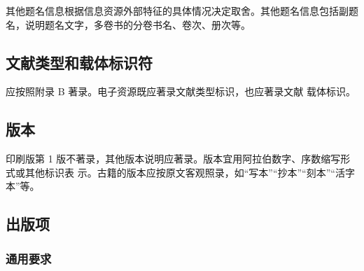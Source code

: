 \documentclass[twoside]{article}%
\begin{document}
\subsubsection{} 其他题名信息根据信息资源外部特征的具体情况决定取舍。其他题名信息包括副题名，说明题名文字，多卷书的分卷书名、卷次、册次等。

\begin{refsection}
\nocite{地壳运动--}
\nocite{三松堂--}
\nocite{世界出版业--}
\nocite{ECL集成电路--}
\nocite{中国科学技术史--}
\nocite{中国科学--}
\nocite{AsianPacificjournal--}

{}
\end{refsection}


\subsection{文献类型和载体标识符}

应按照附录 B 著录。电子资源既应著录文献类型标识，也应著录文献
载体标识。

\begin{refsection}
\nocite{马寅初讲义--}
\nocite{商鞅战秋菊--}
\nocite{严复思想--}
\nocite{中子反射--}
\nocite{信息与文献--}
\nocite{智能戒指--}
\nocite{Quantumfield--}

{}
\end{refsection}

\subsection{版本}

印刷版第 1 版不著录，其他版本说明应著录。版本宜用阿拉伯数字、序数缩写形式或其他标识表
示。古籍的版本应按原文客观照录，如“写本”“抄本”“刻本”“活字本”等。


\begin{refsection}
\nocite{egbookeda--}
\nocite{egbookedb--}
\nocite{egbookedc--,egbookedf--}
\nocite{egbookedd--}
\nocite{egbookede--}
{}
\end{refsection}

\subsection{出版项}

\subsubsection{通用要求}
\end{document}
